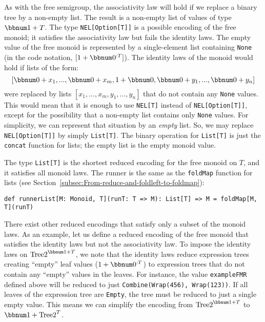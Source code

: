 As with the free semigroup, the associativity law will hold if we
replace a binary tree by a non-empty list. The result is a non-empty
list of values of type $\bbnum 1+T$. The type \lstinline!NEL[Option[T]]!
is a possible encoding of the free monoid; it satisfies the associativity
law but fails the identity laws. The empty value of the free monoid
is represented by a single-element list containing \lstinline!None!
(in the code notation, $[1+\bbnum 0^{:T}]$). The identity laws of
the monoid would hold if lists of the form: 
\[
\left[\bbnum 0+x_{1},...,\bbnum 0+x_{m},1+\bbnum 0,\bbnum 0+y_{1},...,\bbnum 0+y_{n}\right]
\]
were replaced by lists $\left[x_{1},...,x_{m},y_{1},...,y_{n}\right]$
that do not contain any \lstinline!None!
values. This would mean that it is enough to use \lstinline!NEL[T]!
instead of \lstinline!NEL[Option[T]]!,
except for the possibility that a non-empty list contains only \lstinline!None!
values. For simplicity, we can represent that situation by an \emph{empty}
list. So, we may replace \lstinline!NEL[Option[T]]!
by simply \lstinline!List[T]!.
The binary operation for \lstinline!List[T]!
is just the \lstinline!concat!
function for lists; the empty list is the empty monoid value.

The type \lstinline!List[T]!
is the shortest reduced encoding for the free monoid on $T$, and
it satisfies all monoid laws. The runner is the same as the \lstinline!foldMap!
function for lists (see Section~\ref{subsec:From-reduce-and-foldleft-to-foldmap}):
\begin{lstlisting}
def runnerList[M: Monoid, T](runT: T => M): List[T] => M = foldMap[M, T](runT)
\end{lstlisting}
There exist other reduced encodings that satisfy only a subset of
the monoid laws. As an example, let us define a reduced encoding of
the free monoid that satisfies the identity laws but not the associativity
law. To impose the identity laws on $\text{Tree2}^{\bbnum 1+T}$,
we note that the identity laws reduce expression trees creating \textsf{``}empty\textsf{''}
leaf values ($1+\bbnum 0^{:T}$) to expression trees that do not contain
any \textsf{``}empty\textsf{''} values in the leaves. For instance, the value \lstinline!exampleFMR!
defined above will be reduced to just \lstinline!Combine(Wrap(456), Wrap(123))!.
If all leaves of the expression tree are \lstinline!Empty!,
the tree must be reduced to just a single empty value. This means
we can simplify the encoding from $\text{Tree2}^{\bbnum 1+T}$ to
$\bbnum 1+\text{Tree2}^{T}$.

